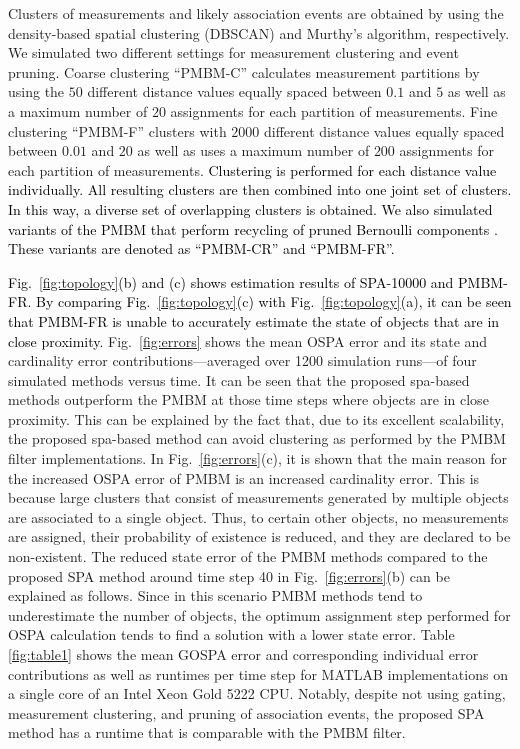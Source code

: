 \documentclass[10pt, twoside, romanappendices]{IEEEtran}
\providecommand{\rd}{\textcolor{black}}
\begin{document}
Clusters of measurements and likely association events are obtained by using the density-based spatial clustering (DBSCAN) and Murthy's algorithm, respectively. We simulated two different settings for measurement clustering and event pruning. Coarse clustering ``PMBM-C'' calculates measurement partitions by using the $50$ different distance values equally spaced between  $0.1$ and $5$ as well as a maximum number of $20$ assignments for each partition of measurements. Fine clustering ``PMBM-F'' clusters with $2000$ different distance values equally spaced between  $0.01$ and $20$ as well as uses a maximum number of $200$ assignments for each partition of measurements. \rd{Clustering is performed for each distance value individually. All resulting clusters are then combined into one joint set of clusters. In this way, a diverse set of overlapping clusters is obtained.} \rd{We also simulated variants of the PMBM that perform recycling of pruned Bernoulli components \cite{Wil:C12}. These variants are denoted as ``PMBM-CR'' and ``PMBM-FR''.}

\rd{Fig.\ \ref{fig:topology}(b) and (c) shows estimation results of SPA-10000 and PMBM-FR. By comparing Fig.\ \ref{fig:topology}(c) with Fig.\ \ref{fig:topology}(a), it can be seen that PMBM-FR is unable to accurately estimate the state of objects that are in close proximity.}
Fig.\ \ref{fig:errors} shows the mean OSPA error and its state and cardinality error contributions---averaged over 1200 simulation runs---of four simulated methods versus time. It can be seen that the proposed \ac{spa}-based methods outperform the PMBM at those time steps where objects are in close proximity. This can be explained by the fact that, due to its excellent scalability, the proposed \ac{spa}-based method can avoid clustering as performed by the PMBM filter implementations. In Fig.\ \ref{fig:errors}(c), it is shown that the main reason for the increased OSPA error of PMBM is an increased cardinality error. This is because large clusters that consist of measurements generated by multiple objects are associated to a single object. Thus, to certain other objects, no measurements are assigned, their probability of existence is reduced, and they are declared to be non-existent. The reduced state error of the PMBM methods compared to the proposed SPA method around time step 40 in Fig.\ \ref{fig:errors}(b) can be explained as follows. Since in this scenario PMBM methods tend to underestimate the number of objects, the optimum assignment step performed for OSPA calculation tends to find a solution with a lower state error. Table \ref{fig:table1} shows the mean GOSPA error and corresponding individual error contributions as well as runtimes per time step for MATLAB implementations on a single core of an Intel Xeon Gold 5222 CPU. Notably, despite not using gating, measurement clustering, and pruning of association events, the proposed SPA method has a runtime that is comparable with the PMBM\vspace{-1mm} filter. 
\end{document}

